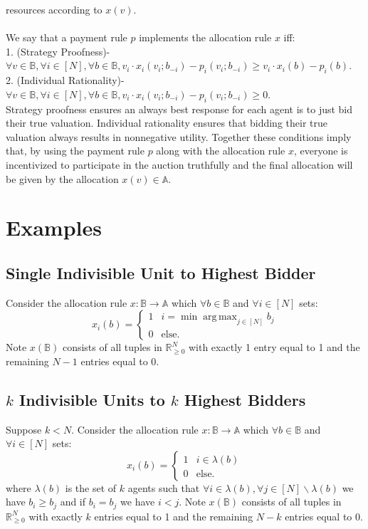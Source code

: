 \documentclass[11pt]{article}
\DeclareMathOperator*{\argmax}{arg\,max}
\theoremstyle{definition}
\theoremstyle{plain}
\begin{document}
resources according to $x(v)$.
\\
\\
We say that a payment rule $p$ implements the allocation rule $x$ iff:
\\
1. (Strategy Proofness)- $\forall v \in \mathbb{B}, \forall i \in [N], \forall b
\in \mathbb{B}, v_i \cdot x_i(v_i;b_{-i})-p_i(v_i;b_{-i}) \geq v_i \cdot x_i(b)-
p_i(b)$.
\\
2. (Individual Rationality)- $\forall v \in \mathbb{B}, \forall i \in [N], \forall
b \in \mathbb{B}, v_i \cdot x_i(v_i;b_{-i})-p_i(v_i;b_{-i}) \geq 0$.
\\
Strategy proofness ensures an always best response for each agent is to just bid
their true valuation. Individual rationality ensures that bidding their true
valuation always results in nonnegative utility. Together these conditions imply
that, by using the payment rule $p$ along with the allocation rule $x$, everyone is
incentivized to participate in the auction truthfully and the final allocation will
be given by the allocation $x(v) \in \mathbb{A}.$
\section{Examples}
\subsection*{Single Indivisible Unit to Highest Bidder}
Consider the allocation rule $x:\mathbb{B} \to \mathbb{A}$ which $\forall b \in
\mathbb{B}$ and $\forall i \in [N]$ sets:
$$x_i(b)=\begin{cases}1 & i=\min\argmax_{j \in [N]} b_j \\ 0 & \text{else}.
\end{cases}$$
Note $x(\mathbb{B})$ consists of all tuples in $\mathbb{R}^N_{\geq 0}$ with exactly
1 entry equal to 1 and the remaining $N-1$ entries equal to $0$.
\subsection*{$k$ Indivisible Units to $k$ Highest Bidders}
Suppose $k< N$. Consider the allocation rule $x:\mathbb{B} \to \mathbb{A}$ which $
\forall b \in \mathbb{B}$ and $\forall i \in [N]$ sets:
$$x_i(b)=\begin{cases}1 & i \in \lambda(b) \\ 0 & \text{else}. \end{cases}$$
where $\lambda(b)$ is the set of $k$ agents such that $\forall i \in \lambda(b),
\forall j \in [N] \backslash \lambda(b)$ we have $b_i \geq b_j$ and if $b_i=b_j$ we
have $i < j$. Note $x(\mathbb{B})$ consists of all tuples in $\mathbb{R}^N_{\geq
0}$ with exactly $k$ entries equal to 1 and the remaining $N-k$ entries equal to
$0$.
\end{document}
